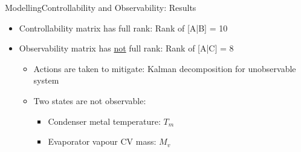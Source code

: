 
\begin{frame}{Modelling}{Controllability and Observability: Results}
	\begin{itemize}
		\item Controllability matrix has full rank: Rank of [A|B] = 10
		\item Observability matrix has \underline{not} full rank: Rank of [A|C] = 8
			\begin{itemize}
				\item Actions are taken to mitigate: Kalman decomposition for unobservable system
				\item Two states are not observable: 
				\begin{itemize}
					\item Condenser metal temperature: $T_m$
					\item Evaporator vapour CV mass: $M_v$
				\end{itemize} 
			\end{itemize}
		
	\end{itemize}
\end{frame}




%	
%	
%	
%	



